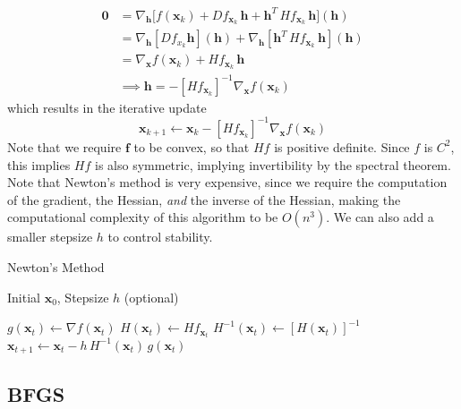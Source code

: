     \begin{align*}
      \mathbf{0} & = \nabla_\mathbf{h} \big[ f(\mathbf{x}_k) + D f_{\mathbf{x}_k} \, \mathbf{h} + \mathbf{h}^T \, H f_{\mathbf{x}_k} \, \mathbf{h} \big] (\mathbf{h}) \\
      & = \nabla_\mathbf{h} [ D f_{x_k} \mathbf{h} ] (\mathbf{h}) + \nabla_\mathbf{h} [\mathbf{h}^T \, H f_{\mathbf{x}_k} \, \mathbf{h}] (\mathbf{h}) \\
      & = \nabla_\mathbf{x} f(\mathbf{x}_k) + H f_{\mathbf{x}_k} \, \mathbf{h} \\
      & \implies \mathbf{h} = - [H f_{\mathbf{x}_k}]^{-1} \nabla_\mathbf{x} f(\mathbf{x}_k) 
    \end{align*}
    which results in the iterative update 
    \begin{equation}
      \mathbf{x}_{k+1} \gets \mathbf{x}_k - [H f_{\mathbf{x}_k}]^{-1} \nabla_\mathbf{x} f (\mathbf{x}_k)
    \end{equation}
    Note that we require $\mathbf{f}$ to be convex, so that $H f$ is positive definite. Since $f$ is $C^2$, this implies $H f$ is also symmetric, implying invertibility by the spectral theorem. Note that Newton's method is very expensive, since we require the computation of the gradient, the Hessian, \textit{and} the inverse of the Hessian, making the computational complexity of this algorithm to be $O(n^3)$. We can also add a smaller stepsize $h$ to control stability. 

    \begin{algorithm}
      \caption{Newton's Method}\label{alg:netwons}
      \begin{algorithmic}

      \Require Initial $\mathbf{x}_0$, Stepsize $h$ (optional)

          \State $g(\mathbf{x}_t) \gets \nabla f(\mathbf{x}_t)$  
          \State $H(\mathbf{x}_t) \gets H f_{\mathbf{x}_t}$ 
          \State $H^{-1} (\mathbf{x}_t) \gets [H(\mathbf{x}_t)]^{-1}$ 
          \State $\mathbf{x}_{t+1} \gets \mathbf{x}_t - h \, H^{-1} (\mathbf{x}_t) \, g(\mathbf{x}_t)$
      \EndFor

      \end{algorithmic}
    \end{algorithm}
  
  \subsection{BFGS}

